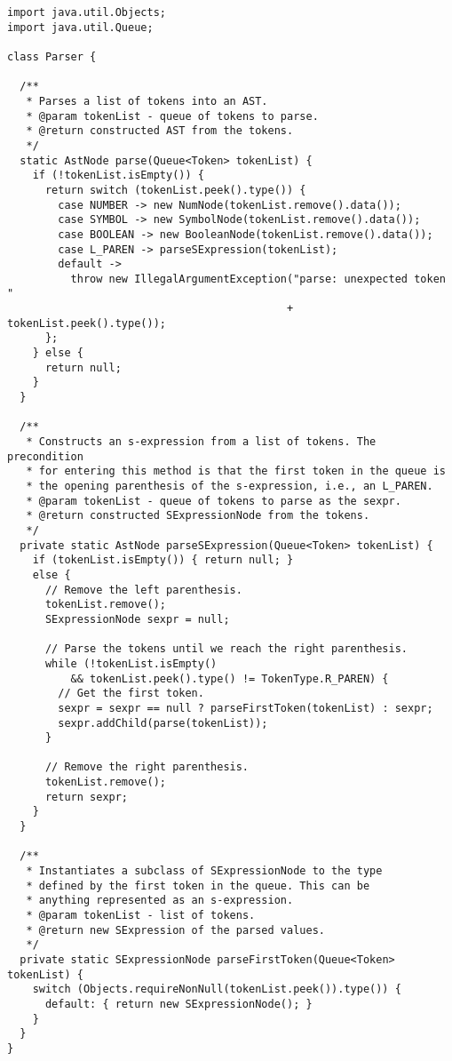 \enlargethispage{-2\baselineskip}
\begin{lstlisting}[language=MyJava]
import java.util.Objects;
import java.util.Queue;

class Parser {

  /**
   * Parses a list of tokens into an AST.
   * @param tokenList - queue of tokens to parse.
   * @return constructed AST from the tokens.
   */
  static AstNode parse(Queue<Token> tokenList) {
    if (!tokenList.isEmpty()) {
      return switch (tokenList.peek().type()) {
        case NUMBER -> new NumNode(tokenList.remove().data());
        case SYMBOL -> new SymbolNode(tokenList.remove().data());
        case BOOLEAN -> new BooleanNode(tokenList.remove().data());
        case L_PAREN -> parseSExpression(tokenList);
        default -> 
          throw new IllegalArgumentException("parse: unexpected token " 
                                            + tokenList.peek().type());
      };
    } else { 
      return null; 
    }
  }

  /**
   * Constructs an s-expression from a list of tokens. The precondition
   * for entering this method is that the first token in the queue is
   * the opening parenthesis of the s-expression, i.e., an L_PAREN.
   * @param tokenList - queue of tokens to parse as the sexpr.
   * @return constructed SExpressionNode from the tokens.
   */
  private static AstNode parseSExpression(Queue<Token> tokenList) {
    if (tokenList.isEmpty()) { return null; }
    else {
      // Remove the left parenthesis.
      tokenList.remove();
      SExpressionNode sexpr = null;

      // Parse the tokens until we reach the right parenthesis.
      while (!tokenList.isEmpty() 
          && tokenList.peek().type() != TokenType.R_PAREN) {
        // Get the first token.
        sexpr = sexpr == null ? parseFirstToken(tokenList) : sexpr;
        sexpr.addChild(parse(tokenList));
      }

      // Remove the right parenthesis.
      tokenList.remove();
      return sexpr;
    }
  }

  /**
   * Instantiates a subclass of SExpressionNode to the type 
   * defined by the first token in the queue. This can be 
   * anything represented as an s-expression.
   * @param tokenList - list of tokens.
   * @return new SExpression of the parsed values.
   */
  private static SExpressionNode parseFirstToken(Queue<Token> tokenList) {
    switch (Objects.requireNonNull(tokenList.peek()).type()) {
      default: { return new SExpressionNode(); }
    }
  }
}
\end{lstlisting}

